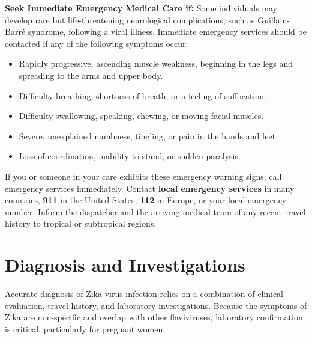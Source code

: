 \textbf{Seek Immediate Emergency Medical Care if:}
Some individuals may develop rare but life-threatening neurological complications, such as Guillain-Barr\'e syndrome, following a viral illness. Immediate emergency services should be contacted if any of the following symptoms occur:
\begin{itemize}
    \item Rapidly progressive, ascending muscle weakness, beginning in the legs and spreading to the arms and upper body.
    \item Difficulty breathing, shortness of breath, or a feeling of suffocation.
    \item Difficulty swallowing, speaking, chewing, or moving facial muscles.
    \item Severe, unexplained numbness, tingling, or pain in the hands and feet.
    \item Loss of coordination, inability to stand, or sudden paralysis.
\end{itemize}
If you or someone in your care exhibits these emergency warning signs, call emergency services immediately. Contact \textbf{local emergency services} in many countries, \textbf{911} in the United States, \textbf{112} in Europe, or your local emergency number. Inform the dispatcher and the arriving medical team of any recent travel history to tropical or subtropical regions.

\section*{Diagnosis and Investigations}
Accurate diagnosis of Zika virus infection relies on a combination of clinical evaluation, travel history, and laboratory investigations. Because the symptoms of Zika are non-specific and overlap with other flaviviruses, laboratory confirmation is critical, particularly for pregnant women.

